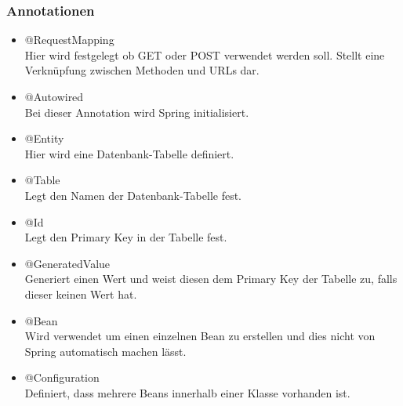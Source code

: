 \subsubsection{Annotationen}
\begin{itemize}
	\item @RequestMapping \\
		Hier wird festgelegt ob GET oder POST verwendet werden soll. Stellt eine Verknüpfung zwischen Methoden und URLs dar.
	\item @Autowired \\
		Bei dieser Annotation wird Spring initialisiert.
	\item @Entity \\
		Hier wird eine Datenbank-Tabelle definiert.
	\item @Table \\
		Legt den Namen der Datenbank-Tabelle fest.
	\item @Id \\
		Legt den Primary Key in der Tabelle fest.
	\item @GeneratedValue \\
		Generiert einen Wert und weist diesen dem Primary Key der Tabelle zu, falls dieser keinen Wert hat.
	\item @Bean \\
		Wird verwendet um einen einzelnen Bean zu erstellen und dies nicht von Spring automatisch machen lässt.
	\item @Configuration \\
		Definiert, dass mehrere Beans innerhalb einer Klasse vorhanden ist.
\end{itemize}



\clearpage
